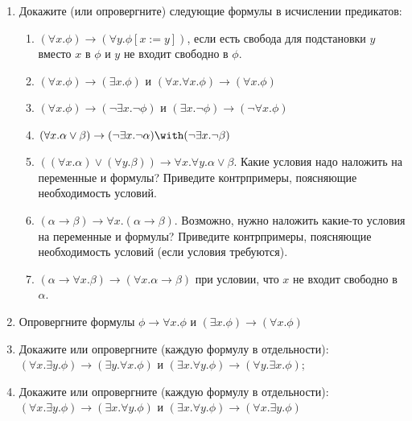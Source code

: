 \documentclass[10pt,a4paper,oneside]{article}
\begin{document}
\begin{enumerate}
\item Докажите (или опровергните) следующие формулы в исчислении предикатов:
\begin{enumerate}
\item $(\forall x.\phi)\rightarrow (\forall y.\phi[x := y])$, если есть свобода для подстановки $y$ вместо $x$ в $\phi$ и $y$ не входит свободно в $\phi$.
\item $(\forall x.\phi)\rightarrow (\exists x.\phi)$ и $(\forall x.\forall x.\phi) \rightarrow (\forall x.\phi)$
\item $(\forall x.\phi) \rightarrow (\neg \exists x.\neg \phi)$ и $(\exists x.\neg\phi) \rightarrow (\neg \forall x.\phi)$
\item $(\forall x.\alpha\vee\beta) \rightarrow (\neg \exists x.\neg \alpha) \with (\neg \exists x.\neg\beta)$
\item $((\forall x.\alpha) \vee (\forall y.\beta)) \rightarrow \forall x.\forall y.\alpha\vee\beta$. Какие условия
надо наложить на переменные и формулы? Приведите контрпримеры, поясняющие необходимость условий.
\item $(\alpha\rightarrow\beta) \rightarrow \forall x.(\alpha\rightarrow\beta)$. Возможно, нужно наложить
какие-то условия на переменные и формулы? Приведите контрпримеры, поясняющие необходимость условий (если 
условия требуются).
\item $(\alpha \rightarrow \forall x.\beta) \rightarrow (\forall x.\alpha\rightarrow\beta)$ при условии, что $x$ не входит свободно в $\alpha$.
\end{enumerate}

\item Опровергните формулы $\phi\rightarrow\forall x.\phi$ и $(\exists x.\phi)\rightarrow (\forall x.\phi)$

\item Докажите или опровергните (каждую формулу в отдельности): $(\forall x.\exists y.\phi) \rightarrow (\exists y.\forall x.\phi)$ и
$(\exists x.\forall y.\phi) \rightarrow (\forall y.\exists x.\phi)$;
\item Докажите или опровергните (каждую формулу в отдельности): $(\forall x.\exists y.\phi) \rightarrow (\exists x.\forall y.\phi)$ и
$(\exists x.\forall y.\phi) \rightarrow (\forall x.\exists y.\phi)$

\end{enumerate}
\end{document}
